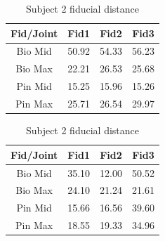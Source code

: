 \begin{table}
\begin{subtable}[c]{0.5\textwidth}
    \centering
        \begin{tabular}{||c | c c c||} 
         \hline
          Fid/Joint & Fid1 & Fid2 & Fid3  \\ [0.5ex] 
         \hline\hline
         Bio Mid & 50.92 & 54.33 & 56.23 \\ 
         \hline
         Bio Max & 22.21 & 26.53 & 25.68 \\
         \hline
         Pin Mid & 15.25 & 15.96 & 15.26 \\
         \hline
         Pin Max & 25.71 & 26.54 & 29.97 \\ [1ex] 
         \hline
        \end{tabular}
    \end{subtable}
   \begin{subtable}[c]{0.5\textwidth}
   \centering
    \begin{tabular}{||c | c c c||} 
         \hline
         Fid/Joint & Fid1 & Fid2 & Fid3  \\ [0.5ex] 
         \hline\hline
         Bio Mid & 35.10 & 12.00 & 50.52 \\ 
         \hline
         Bio Max & 24.10 & 21.24 & 21.61 \\
         \hline
         Pin Mid & 15.66 & 16.56 & 39.60 \\
         \hline
         Pin Max & 18.55 & 19.33 & 34.96 \\ [1ex] 
         \hline
        \end{tabular}
    \end{subtable}
\caption{Subject 2 fiducial distance}
\label{tab:sub2MRI}
\end{table}



